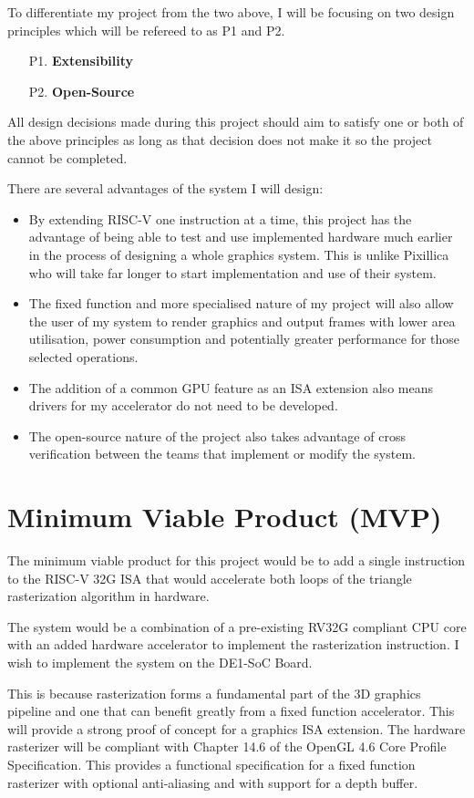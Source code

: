 To differentiate my project from the two above, I will be focusing on two design principles which will be refereed to as P1 and P2.
\begin{itemize}
    \item[P1.] \textbf{Extensibility}
    \item[P2.] \textbf{Open-Source}
\end{itemize}

All design decisions made during this project should aim to satisfy one or both of the above principles as long as that decision does not make it so the project cannot be completed.

There are several advantages of the system I will design:
\begin{itemize}
    \item By extending RISC-V one instruction at a time, this project has the advantage of being able to test and use implemented hardware much earlier in the process of designing a whole graphics system. This is unlike Pixillica who will take far longer to start implementation and use of their system.
    \item The fixed function and more specialised nature of my project will also allow the user of my system to render graphics and output frames with lower area utilisation, power consumption and
potentially greater performance for those selected operations. 
    \item The addition of a common GPU feature as an ISA extension also means drivers for my accelerator do not need to be developed.
    \item The open-source nature of the project also takes advantage of cross verification between the teams that implement or modify the system.
\end{itemize}


\section{Minimum Viable Product (MVP)}
The minimum viable product for this project would be to add a single instruction to the RISC-V 32G ISA that would accelerate both loops of the triangle rasterization algorithm in hardware.

The system would be a combination of a pre-existing RV32G compliant CPU core with an added hardware accelerator to implement the rasterization instruction. I wish to implement the system on the DE1-SoC Board. 

This is because rasterization forms a fundamental part of the 3D graphics pipeline and one that can benefit greatly from a fixed function accelerator. This will provide a strong proof of concept for a graphics ISA extension.
The hardware rasterizer will be compliant with Chapter 14.6 of the OpenGL 4.6 Core Profile Specification\cite{OpenGLSpec}. This provides a functional specification for a fixed function rasterizer with optional anti-aliasing and with support for a depth buffer.

